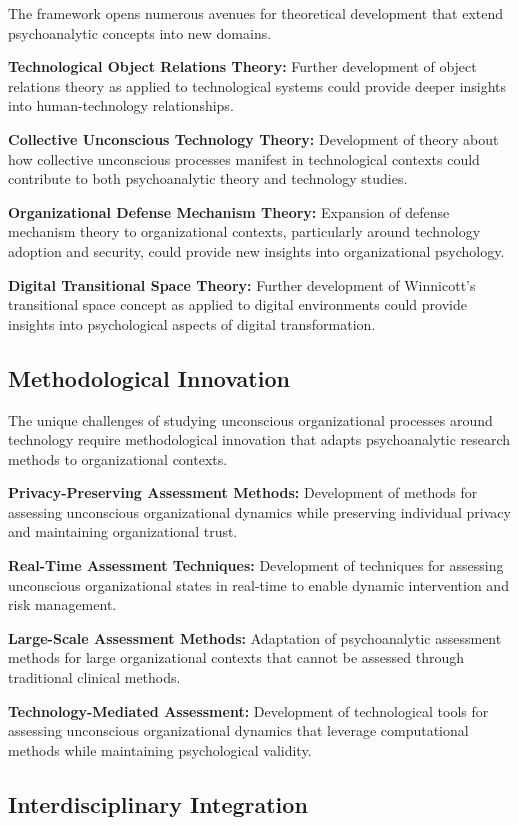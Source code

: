 \documentclass[10pt, twocolumn]{article}
\begin{document}
The framework opens numerous avenues for theoretical development that extend psychoanalytic concepts into new domains.

\textbf{Technological Object Relations Theory:} Further development of object relations theory as applied to technological systems could provide deeper insights into human-technology relationships.

\textbf{Collective Unconscious Technology Theory:} Development of theory about how collective unconscious processes manifest in technological contexts could contribute to both psychoanalytic theory and technology studies.

\textbf{Organizational Defense Mechanism Theory:} Expansion of defense mechanism theory to organizational contexts, particularly around technology adoption and security, could provide new insights into organizational psychology.

\textbf{Digital Transitional Space Theory:} Further development of Winnicott's transitional space concept as applied to digital environments could provide insights into psychological aspects of digital transformation.

\subsection{Methodological Innovation}

The unique challenges of studying unconscious organizational processes around technology require methodological innovation that adapts psychoanalytic research methods to organizational contexts.

\textbf{Privacy-Preserving Assessment Methods:} Development of methods for assessing unconscious organizational dynamics while preserving individual privacy and maintaining organizational trust.

\textbf{Real-Time Assessment Techniques:} Development of techniques for assessing unconscious organizational states in real-time to enable dynamic intervention and risk management.

\textbf{Large-Scale Assessment Methods:} Adaptation of psychoanalytic assessment methods for large organizational contexts that cannot be assessed through traditional clinical methods.

\textbf{Technology-Mediated Assessment:} Development of technological tools for assessing unconscious organizational dynamics that leverage computational methods while maintaining psychological validity.

\subsection{Interdisciplinary Integration}
\end{document}
